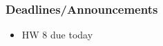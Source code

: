 
\begin{frame}
    \frametitle{Deadlines/Announcements}
    \begin{itemize}
        \item HW 8 due today
    \end{itemize}
\end{frame}
